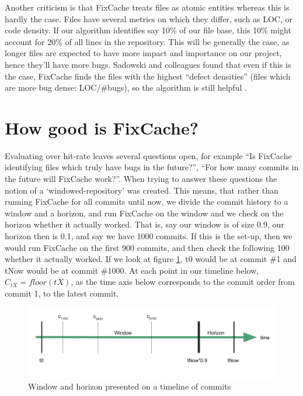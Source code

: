 \documentclass[12pt,twoside,notitlepage]{report}
\newcommand{\fxch}{FixCache}
\begin{document}
Another criticism is that \fxch{} treats files as atomic entities whereas this is hardly the case. Files have several metrics on which they differ, such as LOC, or code density. If our algorithm identifies say 10\% of our file base, this 10\% might account for 20\% of all lines in the repository. This will be generally the case, as longer files are expected to have more impact and importance on our project, hence they'll have more bugs. Sadowski and colleagues found that even if this is the case, \fxch{} finds the files with the highest ``defect densities'' (files which are more bug dense: LOC/\#bugs), so the algorithm is still helpful \cite{Bugcache}.

\section{How good is \fxch{}?}\label{windowedrep}
Evaluating over hit-rate leaves several questions open, for example ``Is \fxch{} identifying files which truly have bugs in the future?'', ``For how many commits in the future will \fxch{} work?''. When trying to answer these questions the notion of a `windowed-repository' was created. This means, that rather than running \fxch{} for all commits until now, we divide the commit history to a window and a horizon, and run \fxch{} on the window and we check on the horizon whether it actually worked. That is, say our window is of size 0.9, our horizon then is 0.1, and say we have 1000 commits. If this is the set-up, then we would run \fxch{} on the first 900 commits, and then check the following 100 whether it actually worked. If we look at figure \ref{window_horizon}, t0 would be at commit \#1 and tNow would be at commit \#1000. At each point in our timeline below, $C_{tX} = floor(tX)$, as the time axis below corresponds to the commit order from commit 1, to the latest commit.

\begin{figure}[h]
\includegraphics[width=1.0\textwidth]{window_horizon.png}

\caption{Window and horizon presented on a timeline of commits}
\label{window_horizon}
\end{figure}
\end{document}
